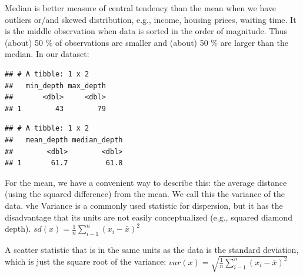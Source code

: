 \documentclass[
]{book}
\newenvironment{Shaded}{\begin{snugshade}}{\end{snugshade}}
\newcommand{\AttributeTok}[1]{\textcolor[rgb]{0.77,0.63,0.00}{#1}}
\newcommand{\CommentTok}[1]{\textcolor[rgb]{0.56,0.35,0.01}{\textit{#1}}}
\newcommand{\FunctionTok}[1]{\textcolor[rgb]{0.00,0.00,0.00}{#1}}
\newcommand{\NormalTok}[1]{#1}
\newcommand{\SpecialCharTok}[1]{\textcolor[rgb]{0.00,0.00,0.00}{#1}}
\begin{document}
Median is better measure of central tendency than the mean when we have outliers or/and skewed distribution, e.g., income, housing prices, waiting time. It is the middle observation when data is sorted in the order of magnitude. Thus (about) 50 \% of observations are smaller and (about) 50 \% are larger than the median. In our dataset:

\begin{Shaded}
\end{Shaded}

\begin{verbatim}
## # A tibble: 1 x 2
##   min_depth max_depth
##       <dbl>     <dbl>
## 1        43        79
\end{verbatim}

\begin{Shaded}
\end{Shaded}

\begin{verbatim}
## # A tibble: 1 x 2
##   mean_depth median_depth
##        <dbl>        <dbl>
## 1       61.7         61.8
\end{verbatim}

For the mean, we have a convenient way to describe this: the average distance (using the squared difference) from the mean. We call this the variance of the data. vhe Variance is a commonly used statistic for dispersion, but it has the disadvantage that its units are not easily conceptualized (e.g., squared diamond depth).
\(sd(x) = \frac{1}{n} \sum_{i-1}^n (x_i-\bar{x})^2\)

A scatter statistic that is in the same units as the data is the standard deviation, which is just the square root of the variance:
\(var(x) = \sqrt{\frac{1}{n} \sum_{i-1}^n (x_i-\bar{x})^2}\)
\end{document}
